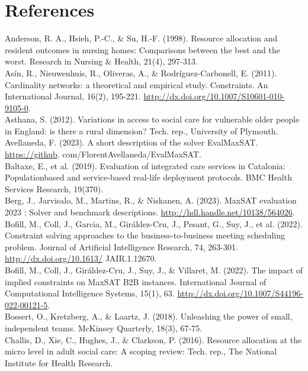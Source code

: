 \documentclass[10pt]{article}
\begin{document}
\section*{References}
Anderson, R. A., Hsieh, P.-C., \& Su, H.-F. (1998). Resource allocation and resident outcomes in nursing homes: Comparisons between the best and the worst. Research in Nursing \& Health, 21(4), 297-313.\\
Asín, R., Nieuwenhuis, R., Oliveras, A., \& Rodríguez-Carbonell, E. (2011). Cardinality networks: a theoretical and empirical study. Constraints. An International Journal, 16(2), 195-221. \href{http://dx.doi.org/10.1007/S10601-010-9105-0}{http://dx.doi.org/10.1007/S10601-010-9105-0}.\\
Asthana, S. (2012). Variations in access to social care for vulnerable older people in England: is there a rural dimension? Tech. rep., University of Plymouth.\\
Avellaneda, F. (2023). A short description of the solver EvalMaxSAT. \href{https://github}{https://github}. com/FlorentAvellaneda/EvalMaxSAT.\\
Baltaxe, E., et al. (2019). Evaluation of integrated care services in Catalonia: Populationbased and service-based real-life deployment protocols. BMC Health Services Research, 19(370).\\
Berg, J., Jarvisalo, M., Martins, R., \& Niskanen, A. (2023). MaxSAT evaluation 2023 : Solver and benchmark descriptions. \href{http://hdl.handle.net/10138/564026}{http://hdl.handle.net/10138/564026}.\\
Bofill, M., Coll, J., Garcia, M., Giráldez-Cru, J., Pesant, G., Suy, J., et al. (2022). Constraint solving approaches to the business-to-business meeting scheduling problem. Journal of Artificial Intelligence Research, 74, 263-301. \href{http://dx.doi.org/10.1613/}{http://dx.doi.org/10.1613/} JAIR.1.12670.\\
Bofill, M., Coll, J., Giráldez-Cru, J., Suy, J., \& Villaret, M. (2022). The impact of implied constraints on MaxSAT B2B instances. International Journal of Computational Intelligence Systems, 15(1), 63. \href{http://dx.doi.org/10.1007/S44196-022-00121-5}{http://dx.doi.org/10.1007/S44196-022-00121-5}.\\
Bossert, O., Kretzberg, A., \& Laartz, J. (2018). Unleashing the power of small, independent teams. McKinsey Quarterly, 18(3), 67-75.\\
Challis, D., Xie, C., Hughes, J., \& Clarkson, P. (2016). Resource allocation at the micro level in adult social care: A scoping review: Tech. rep., The National Institute for Health Research.\\
\end{document}
